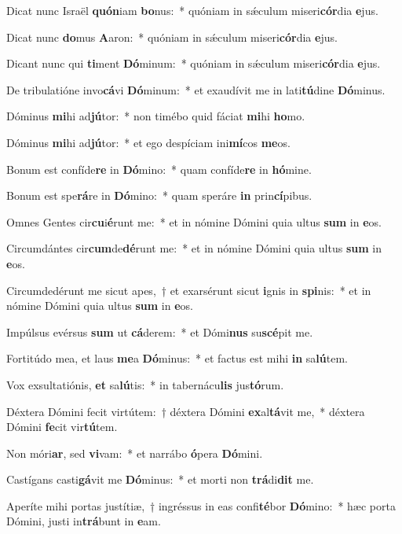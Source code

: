\item Dicat nunc Israël \textbf{quón}iam \textbf{bo}nus:~* quóniam in sǽculum miseri\textbf{cór}dia \textbf{e}jus.
\item Dicat nunc \textbf{do}mus \textbf{A}aron:~* quóniam in sǽculum miseri\textbf{cór}dia \textbf{e}jus.
\item Dicant nunc qui \textbf{ti}ment \textbf{Dó}minum:~* quóniam in sǽculum miseri\textbf{cór}dia \textbf{e}jus.
\item De tribulatióne invo\textbf{cá}vi \textbf{Dó}minum:~* et exaudívit me in lati\textbf{tú}dine \textbf{Dó}minus.
\item Dóminus \textbf{mi}hi ad\textbf{jú}tor:~* non timébo quid fáciat \textbf{mi}hi \textbf{ho}mo.
\item Dóminus \textbf{mi}hi ad\textbf{jú}tor:~* et ego despíciam ini\textbf{mí}cos \textbf{me}os.
\item Bonum est confíde\textbf{re} in \textbf{Dó}mino:~* quam confíde\textbf{re} in \textbf{hó}mine.
\item Bonum est spe\textbf{rá}re in \textbf{Dó}mino:~* quam speráre \textbf{in} prin\textbf{cí}pibus.
\item Omnes Gentes cir\textbf{cu}i\textbf{é}runt me:~* et in nómine Dómini quia ultus \textbf{sum} in \textbf{e}os.
\item Circumdántes cir\textbf{cum}de\textbf{dé}runt me:~* et in nómine Dómini quia ultus \textbf{sum} in \textbf{e}os.
\item Circumdedérunt me sicut apes,~† et exarsérunt sicut \textbf{i}gnis in \textbf{spi}nis:~* et in nómine Dómini quia ultus \textbf{sum} in \textbf{e}os.
\item Impúlsus evérsus \textbf{sum} ut \textbf{cá}derem:~* et Dómi\textbf{nus} su\textbf{scé}pit me.
\item Fortitúdo mea, et laus \textbf{me}a \textbf{Dó}minus:~* et factus est mihi \textbf{in} sa\textbf{lú}tem.
\item Vox exsultatiónis, \textbf{et} sa\textbf{lú}tis:~* in tabernácu\textbf{lis} jus\textbf{tó}rum.
\item Déxtera Dómini fecit virtútem:~† déxtera Dómini \textbf{ex}al\textbf{tá}vit me,~* déxtera Dómini \textbf{fe}cit vir\textbf{tú}tem.
\item Non móri\textbf{ar}, sed \textbf{vi}vam:~* et narrábo \textbf{ó}pera \textbf{Dó}mini.
\item Castígans casti\textbf{gá}vit me \textbf{Dó}minus:~* et morti non \textbf{trá}di\textbf{dit} me.
\item Aperíte mihi portas justítiæ,~† ingréssus in eas confi\textbf{té}bor \textbf{Dó}mino:~* hæc porta Dómini, justi in\textbf{trá}bunt in \textbf{e}am.
